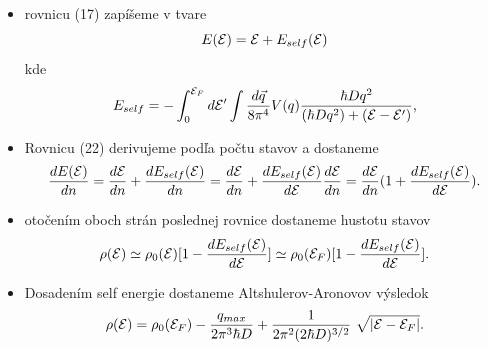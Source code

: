 \documentclass[
	11pt, %
]{beamer}
\begin{document}
\begin{frame}

\begin{itemize}
\item rovnicu (17)  zapíšeme v tvare  
\begin{equation}
E(\mathcal{E})=\mathcal{E}+E_{self}(\mathcal{E})
\end{equation}
 kde 
\begin{equation}
 \label{eq:aa_self_energy}
 E_{self}=-\int_{0}^{\mathcal{E}_F}d\mathcal{E}' \int \frac{d\vec{q}}{8\pi^4}V(q)\frac{\hbar D q^2}{(\hbar D q^2)+(\mathcal{E}-\mathcal{E}')}\text{,}
\end{equation}

\item Rovnicu (22) derivujeme podľa počtu stavov a dostaneme 
\begin{equation}
\label{eq:der}
  \frac{d E(\mathcal{E})}{dn}=\frac{d\mathcal{E}}{dn}+\frac{dE_{self}(\mathcal{E})}{dn}=\frac{d\mathcal{E}}{dn}+\frac{dE_{self}(\mathcal{E})}{d\mathcal{E}}\frac{d\mathcal{E}}{dn}=\frac{d\mathcal{E}}{dn}(1+\frac{dE_{self}(\mathcal{E})}{d\mathcal{E}}) \text{.}
\end{equation}
\item otočením oboch strán poslednej rovnice dostaneme hustotu stavov
\begin{equation}
 \label{eq:aa_dos2}
 \rho(\mathcal{E}) \simeq \rho_0(\mathcal{E})[1-\frac{dE_{self}(\mathcal{E})}{d\mathcal{E}}] \simeq \rho_0(\mathcal{E}_F)[1-\frac{dE_{self}(\mathcal{E})}{d\mathcal{E}}] \text{.}
\end{equation}
\item Dosadením self energie dostaneme Altshulerov-Aronovov výsledok
\begin{equation}
 \label{eq:aa_dos3 fin}
 \rho(\E)=\rho_0(\E_F) - \frac{q_{max}}{2\pi^3 \hbar D}
 +    \frac{1}{2\pi^2 (2\hbar D)^{3/2}}  \ \sqrt{|\E-\E_F|}  \text{.}
\end{equation}
\end{itemize}
\end{frame}
\end{document}
